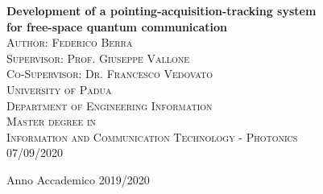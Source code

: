 \begin{titlepage}
  \begin{center}


    {\LARGE \bfseries Development of a pointing-acquisition-tracking system\\ for free-space quantum communication}\\[2cm]

    \textsc{\large Author: Federico Berra}\\
    \textsc{\large Supervisor: Prof. Giuseppe Vallone}\\
    \textsc{\large Co-Supervisor: Dr. Francesco Vedovato}\\[1.2cm]

    \textsc{\LARGE University of Padua}\\[1.2cm]

    \textsc{\Large Department of Engineering Information}\\[1.2cm]

    \textsc{\Large Master degree in}\\[0.5cm]
    \textsc{\Large Information and Communication Technology - Photonics}\\[2cm]
    \textsc{\large 07/09/2020}\\
    \vfill

    {\large Anno Accademico 2019/2020}
  \end{center}
\end{titlepage}
